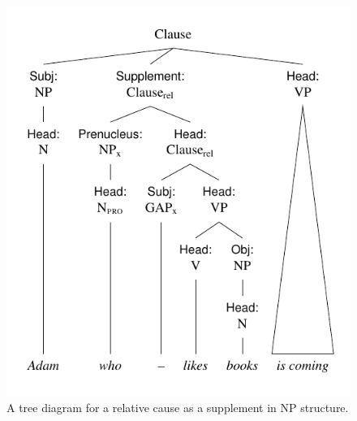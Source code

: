 \begin{figure}[ht]
    \centering
    \includegraphics{figures/adam-who-likes-books.pdf}
    \caption{A tree diagram for a relative cause as a supplement in NP structure.}
    \label{fig:a-guy-who-likes}
\end{figure}

